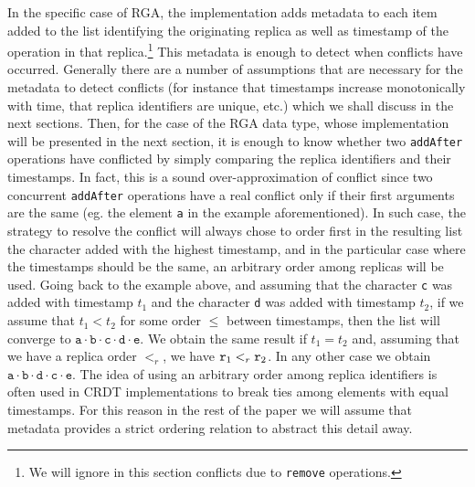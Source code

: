 

In the specific case of RGA, the implementation adds metadata to each
item added to the list identifying the originating replica as well as
timestamp of the operation in that replica.\footnote{We will ignore in
  this section conflicts due to \lstinline|remove| operations.}
%
This metadata is enough to detect when conflicts have occurred.
%
Generally there are a number of assumptions that are necessary for the
metadata to detect conflicts (for instance that timestamps increase
monotonically with time, that replica identifiers are unique, etc.)
which we shall discuss in the next sections.
%
Then, for the case of the RGA data type, whose implementation will be
presented in the next section, it is enough to know whether
two \lstinline|addAfter| operations have conflicted by simply
comparing the replica identifiers and their timestamps.
%
In fact, this is a sound over-approximation of conflict since two
concurrent \lstinline|addAfter| operations have a real conflict only
if their first arguments are the same (eg. the element \lstinline|a|
in the example aforementioned).
%
In such case, the strategy to resolve the conflict will always chose
to order first in the resulting list the character added with the
highest timestamp, and in the particular case where the timestamps
should be the same, an arbitrary order among replicas will be used.
%
Going back to the example above, and assuming that the character
\lstinline|c| was added with timestamp $t_1$ and the character
\lstinline|d| was added with timestamp $t_2$, if we assume that
$t_1 < t_2$ for some order $\leq$ between timestamps, then the list will
converge to $\mathtt{a \cdot b \cdot c \cdot d \cdot e}$.
%
We obtain the same result if $t_1 = t_2$ and, assuming that we have a replica
order $<_r$, we have $\mathtt{r}_1 <_r \mathtt{r}_2$.
%
In any other case we obtain $\mathtt{a \cdot b \cdot d \cdot c \cdot e}$.
%
The idea of using an arbitrary order among replica identifiers is
often used in CRDT implementations to break ties among elements with
equal timestamps.
%
For this reason in the rest of the paper we will assume that metadata
provides a strict ordering relation to abstract this detail away.

